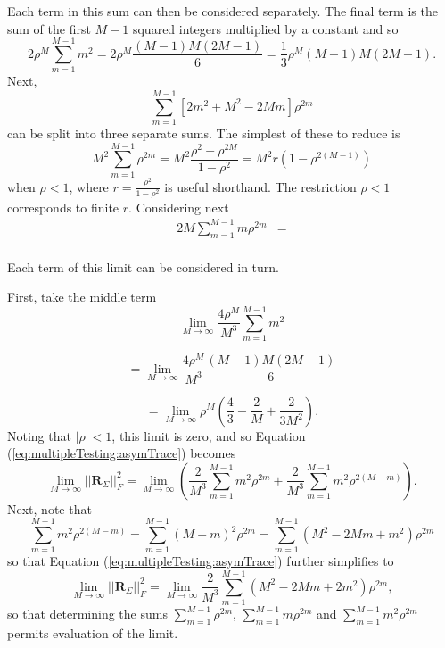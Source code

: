 \documentclass[letterpaper,12pt,oneside,final]{article}
\newcommand{\m}[1]{\mathbf{#1}}               %
\newcommand{\norm}[1]{||{#1}||}              %
\newcommand{\frob}[1]{\norm{#1}_F}
\newcommand{\abs}[1]{\lvert{#1}\rvert}              %
\begin{document}
Each term in this sum can then be considered separately. The final term is the sum of the first $M-1$ squared integers multiplied by a constant and so
\begin{equation} \label{eq:multipleTesting:traceterm4}
  2 \rho^M \sum_{m = 1}^{M-1} m^2 = 2 \rho^M \frac{(M-1)M(2M-1)}{6} = \frac{1}{3}\rho^M (M-1)M(2M-1).
\end{equation}
Next,
$$\sum_{m = 1}^{M-1} \left [ 2m^2 + M^2 - 2Mm \right ] \rho^{2m}$$
can be split into three separate sums. The simplest of these to reduce is
\begin{equation} \label{eq:multipleTesting:traceterm3}
  M^2 \sum_{m = 1}^{M-1} \rho^{2m} = M^2 \frac{\rho^2 - \rho^{2M}}{1 - \rho^2} = M^2 r (1 - \rho^{2(M-1)})
\end{equation}
when $\rho < 1$, where $r = \frac{\rho^2}{1 - \rho^2}$ is useful shorthand. The restriction $\rho < 1$ corresponds to finite $r$. Considering next
\begin{equation} \label{eq:multipleTesting:traceterm2}
  \begin{aligned}
    2M \sum_{m = 1}^{M-1} m \rho^{2m} & = \\
  \end{aligned}
\end{equation}

Each term of this limit can be considered in turn.

First, take the middle term
$$\lim_{M \rightarrow \infty} \frac{4\rho^M}{M^3}\sum_{m = 1}^{M-1} m^2$$

$$=\lim_{M \rightarrow \infty} \frac{4\rho^M}{M^3} \frac{(M-1)M(2M-1)}{6}$$

$$=\lim_{M \rightarrow \infty} \rho^M \left ( \frac{4}{3} - \frac{2}{M} + \frac{2}{3M^2} \right ).$$
Noting that $\abs{\rho} < 1$, this limit is zero, and so Equation (\ref{eq:multipleTesting:asymTrace}) becomes
\begin{equation*}
    \lim_{M \rightarrow \infty} \frob{\m{R}_{\Sigma}}^2  = \lim_{M \rightarrow \infty} \left ( \frac{2}{M^3} \sum_{m = 1}^{M-1} m^2 \rho^{2m} + \frac{2}{M^3} \sum_{m = 1}^{M-1} m^2 \rho^{2(M-m)} \right ).
\end{equation*}
Next, note that
$$\sum_{m = 1}^{M-1} m^2 \rho^{2(M-m)} = \sum_{m = 1}^{M-1} (M - m)^2 \rho^{2m} = \sum_{m = 1}^{M-1} (M^2 - 2Mm + m^2) \rho^{2m}$$
so that Equation (\ref{eq:multipleTesting:asymTrace}) further simplifies to
\begin{equation} \label{eq:multipleTesting:traceSimpd}
    \lim_{M \rightarrow \infty} \frob{\m{R}_{\Sigma}}^2  = \lim_{M \rightarrow \infty} \frac{2}{M^3} \sum_{m = 1}^{M-1} (M^2 - 2Mm + 2m^2) \rho^{2m},
\end{equation}
so that determining the sums $\sum_{m = 1}^{M-1} \rho^{2m}$, $\sum_{m = 1}^{M-1} m \rho^{2m}$ and $\sum_{m=1}^{M-1} m^2 \rho^{2m}$ permits evaluation of the limit.
\end{document}
